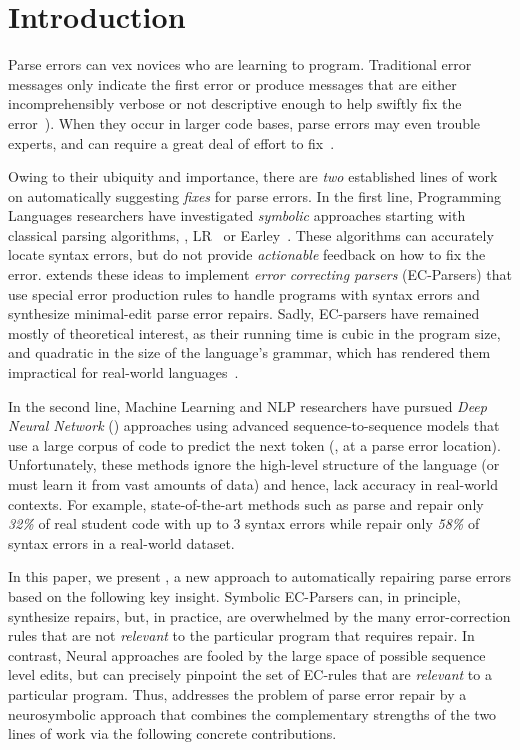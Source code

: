 
\section{Introduction}
\label{sec:intro}

Parse errors can vex novices who
are learning to program.
%
Traditional error messages
only indicate the first error
or produce messages that
are either incomprehensibly
verbose or not descriptive
enough to help swiftly fix
the error~\citep{qian2017, VanDerSpek_2005}).
%
When they occur in larger code bases, parse errors
may even trouble experts, and can require a great deal of
effort to fix~\citep{Denny_2012, Ahadi_2018, Kummerfeld2003}.

Owing to their ubiquity and importance, there are \emph{two}
established lines of work on automatically suggesting \emph{fixes}
for parse errors.
%
In the first line, Programming Languages researchers
have investigated \emph{symbolic} approaches starting
with classical parsing algorithms, \eg, LR~\citep{Aho1974}
or Earley~\citep{Earley_1970}.
%
These algorithms can accurately locate syntax errors,
but do not provide \emph{actionable} feedback on how
to fix the error.
%
\citet{Aho_1972} extends these ideas to implement
\emph{error correcting parsers} (EC-Parsers) that
use special error production rules to handle
programs with syntax errors and
synthesize minimal-edit parse error repairs.
%
Sadly, EC-parsers have remained mostly of theoretical
interest, as their running time is cubic in the
program size, and quadratic in the size of the language's
grammar, which has rendered them impractical for
real-world languages~\citep{McLean1996, Rajasekaran2014}.

In the second line, Machine Learning and NLP researchers have
pursued \emph{Deep Neural Network} (\dnn)
approaches using advanced sequence-to-sequence
models \citep{Sutskever_2014, Hardalov_2018}
that use a large corpus of code to predict
the next token (\eg, at a parse error location).
%
Unfortunately, these methods ignore the high-level structure
of the language (or must learn it from vast amounts
of data) and hence, lack accuracy in real-world contexts.
%
For example, state-of-the-art methods such as \citet{Ahmed_2021} parse and
repair only \emph{32\%} of real student code with up to 3 syntax errors
while \citet{Wu2020} repair only \emph{58\%} of syntax errors in a
real-world dataset.

In this paper, we present \toolname, a new approach
to automatically repairing parse errors
based on the following key insight.
%
Symbolic EC-Parsers \citep{Aho_1972} can, in principle,
synthesize repairs, but, in practice, are overwhelmed by
the many error-correction rules that are not \emph{relevant}
to the particular program that requires repair.
%
In contrast, Neural approaches are fooled by the large
space of possible sequence level edits, but can precisely
pinpoint the set of EC-rules that are \emph{relevant}
to a particular program.
%
Thus, \toolname addresses the problem of parse error
repair by a neurosymbolic approach that combines
the complementary strengths of the two lines of work
via the following concrete contributions.

